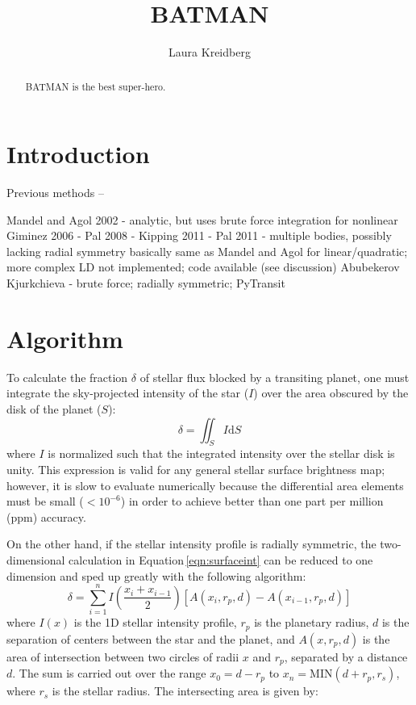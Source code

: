 \documentclass[12pt,preprint]{aastex}
\begin{document}
\title{BATMAN}

\author{Laura Kreidberg}



\begin{abstract}
BATMAN is the best super-hero.
\end{abstract}



\section{Introduction}
Previous methods --

Mandel and Agol 2002 - analytic, but uses brute force integration for nonlinear
Giminez 2006 -
Pal 2008 - 
Kipping 2011 -
Pal 2011 - multiple bodies, possibly lacking radial symmetry
	basically same as Mandel and Agol for linear/quadratic; more complex LD not implemented; code available (see discussion)
Abubekerov 
Kjurkchieva - brute force; radially symmetric; 
PyTransit

\section{Algorithm}
\label{section:algorithm}
To calculate the fraction $\delta$ of stellar flux blocked by a transiting planet, one must integrate the sky-projected intensity of the star ($I$) over the area obscured by the disk of the planet ($S$):
\begin{equation}
\delta = \iint_S{I \mathrm{d}S}
\label{eqn:surfaceint}
\end{equation}
where $I$ is normalized such that the integrated intensity over the stellar disk is unity. This expression is valid for any general stellar surface brightness map; however, it is slow to evaluate numerically because the differential area elements must be small ($<10^{-6}$) in order to achieve better than one part per million (ppm) accuracy.

On the other hand, if the stellar intensity profile is radially symmetric, the two-dimensional calculation in Equation\,\ref{eqn:surfaceint} can be reduced to one dimension and sped up greatly with the following algorithm: 
\begin{equation}
\delta = \sum_{i=1}^{n} I\left(\frac{x_i+x_{i-1}}{2}\right) \left[A(x_{i}, r_p, d) - A(x_{i-1}, r_p, d)\right]
\end{equation}
where $I(x)$ is the 1D stellar intensity profile, $r_p$ is the planetary radius, $d$ is the separation of centers between the star and the planet, and $A(x, r_p, d)$ is the area of intersection between two circles of radii $x$ and $r_p$, separated by a distance $d$.  The sum is carried out over the range $x_0 = d - r_p$ to $x_n = \textrm{MIN}(d + r_p, r_s)$, where $r_s$ is the stellar radius.  The intersecting area is given by:
\end{document}
